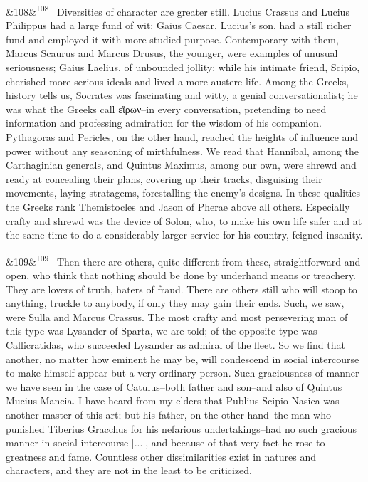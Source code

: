\documentclass[12pt]{article}
\newcommand{\para}[1][]{\par\noindent\ifx&#1&\else\textsuperscript{\footnotesize #1}~\fi}
\begin{document}
\para[108] Diversities of character are greater still. Lucius Crassus and Lucius Philippus had a large fund of wit; Gaius Caesar, Lucius's son, had a still richer fund and employed it with more studied purpose. Contemporary with them, Marcus Scaurus and Marcus Drusus, the younger, were examples of unusual seriousness; Gaius Laelius, of unbounded jollity; while his intimate friend, Scipio, cherished more serious ideals and lived a more austere life. Among the Greeks, history tells us, Socrates was fascinating and witty, a genial conversationalist; he was what the Greeks call εἴρων--in every conversation, pretending to need information and professing admiration for the wisdom of his companion. Pythagoras and Pericles, on the other hand, reached the heights of influence and power without any seasoning of mirthfulness. We read that Hannibal, among the Carthaginian generals, and Quintus Maximus, among our own, were shrewd and ready at concealing their plans, covering up their tracks, disguising their movements, laying stratagems, forestalling the enemy's designs. In these qualities the Greeks rank Themistocles and Jason of Pherae above all others. Especially crafty and shrewd was the device of Solon, who, to make his own life safer and at the same time to do a considerably larger service for his country, feigned insanity.

\para[109] Then there are others, quite different from these, straightforward and open, who think that nothing should be done by underhand means or treachery. They are lovers of truth, haters of fraud. There are others still who will stoop to anything, truckle to anybody, if only they may gain their ends. Such, we saw, were Sulla and Marcus Crassus. The most crafty and most persevering man of this type was Lysander of Sparta, we are told; of the opposite type was Callicratidas, who succeeded Lysander as admiral of the fleet. So we find that another, no matter how eminent he may be, will condescend in social intercourse to make himself appear but a very ordinary person. Such graciousness of manner we have seen in the case of Catulus--both father and son--and also of Quintus Mucius Mancia. I have heard from my elders that Publius Scipio Nasica was another master of this art; but his father, on the other hand--the man who punished Tiberius Gracchus for his nefarious undertakings--had no such gracious manner in social intercourse [...], and because of that very fact he rose to greatness and fame. Countless other dissimilarities exist in natures and characters, and they are not in the least to be criticized.
\end{document}
